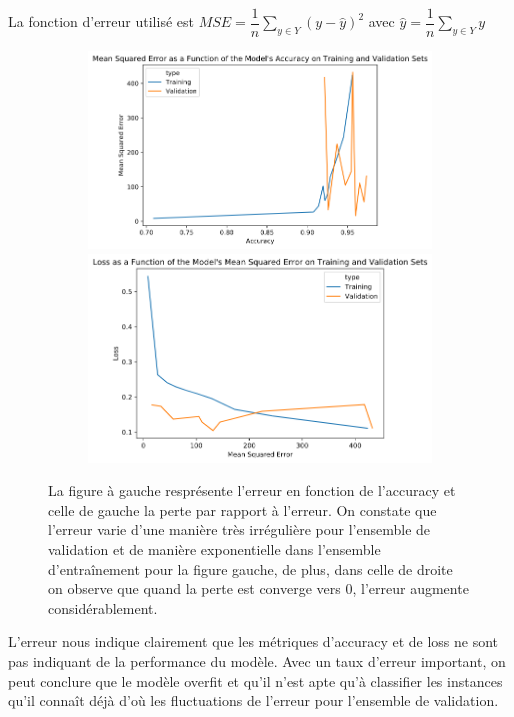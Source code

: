 \documentclass[french]{article}
\theoremstyle{mytheoremstyle}
\theoremstyle{mytheoremstyle}
\theoremstyle{myproblemstyle}
\begin{document}
    La fonction d'erreur utilisé est $MSE = \dfrac{1}{n}\sum\limits_{y \in Y} (y - \hat{y})^2$ avec $\hat{y}=\dfrac{1}{n}\sum\limits_{y \in Y} y$
    \begin{figure}[H]
        \centering
        \begin{subfigure}{\linewidth}
            \includegraphics[width=.49\textwidth]{images/cnn_mse_acc.png}
            \hfill
            \includegraphics[width=.47\textwidth]{images/cnn_loss_mse.png}
        \end{subfigure}
        \caption{La figure à gauche resprésente l'erreur en fonction de l'accuracy et celle de gauche la perte par rapport à l'erreur. On constate que l'erreur varie d'une manière très irrégulière pour l'ensemble de validation et de manière exponentielle dans l'ensemble d'entraînement pour la figure gauche, de plus, dans celle de droite on observe que quand la perte est converge vers 0, l'erreur augmente considérablement.}
        \label{}
    \end{figure}
    L'erreur nous indique clairement que les métriques d'accuracy et de loss ne sont pas indiquant de la performance du modèle. Avec un taux d'erreur important, on peut conclure que le modèle overfit et qu'il n'est apte qu'à classifier les instances qu'il connaît déjà d'où les fluctuations de l'erreur pour l'ensemble de validation.
\end{document}
